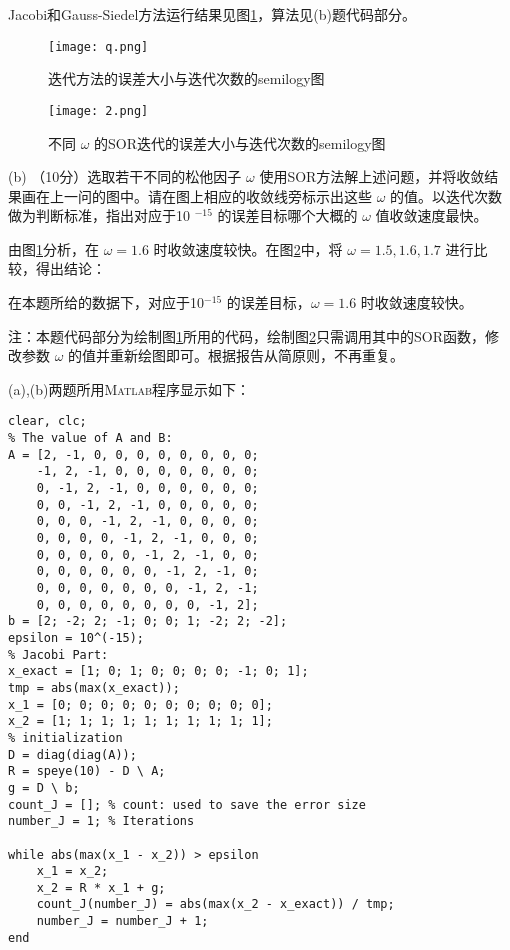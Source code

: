 \documentclass[12pt,a4paper,UTF8]{ctexart}
\begin{document}
\begin{enumerate}
          Jacobi和Gauss-Siedel方法运行结果见图\ref{4}，算法见(b)题代码部分。

          \begin{figure}[H]
              \centering
              \texttt{[image: q.png]}
              \caption{迭代方法的误差大小与迭代次数的semilogy图}\label{4}
          \end{figure}
          \begin{figure}[H]
              \centering
              \texttt{[image: 2.png]}
              \caption{不同 $\omega$ 的SOR迭代的误差大小与迭代次数的semilogy图}\label{sor}
          \end{figure}
          (b) （10分）选取若干不同的松他因子 $\omega$ 使用SOR方法解上述问题，并将收敛结果画在上一问的图中。请在图上相应的收敛线旁标示出这些 $\omega$ 的值。以迭代次数做为判断标准，指出对应于10 $^{-15}$ 的误差目标哪个大概的 $\omega$ 值收敛速度最快。

          由图\ref{4}分析，在 $\omega = 1.6$ 时收敛速度较快。在图\ref{sor}中，将 $\omega = 1.5, 1.6, 1.7$ 进行比较，得出结论：

          在本题所给的数据下，对应于10$^{-15}$ 的误差目标，$\omega = 1.6$ 时收敛速度较快。

          注：本题代码部分为绘制图\ref{4}所用的代码，绘制图\ref{sor}只需调用其中的SOR函数，修改参数 $\omega$ 的值并重新绘图即可。根据报告从简原则，不再重复。

          (a),(b)两题所用\textsc{Matlab}程序显示如下：
          \begin{lstlisting}[frame=single]
clear, clc;
% The value of A and B:
A = [2, -1, 0, 0, 0, 0, 0, 0, 0, 0;
    -1, 2, -1, 0, 0, 0, 0, 0, 0, 0;
    0, -1, 2, -1, 0, 0, 0, 0, 0, 0;
    0, 0, -1, 2, -1, 0, 0, 0, 0, 0;
    0, 0, 0, -1, 2, -1, 0, 0, 0, 0;
    0, 0, 0, 0, -1, 2, -1, 0, 0, 0;
    0, 0, 0, 0, 0, -1, 2, -1, 0, 0;
    0, 0, 0, 0, 0, 0, -1, 2, -1, 0;
    0, 0, 0, 0, 0, 0, 0, -1, 2, -1;
    0, 0, 0, 0, 0, 0, 0, 0, -1, 2];
b = [2; -2; 2; -1; 0; 0; 1; -2; 2; -2];
epsilon = 10^(-15);
% Jacobi Part:
x_exact = [1; 0; 1; 0; 0; 0; 0; -1; 0; 1];
tmp = abs(max(x_exact));
x_1 = [0; 0; 0; 0; 0; 0; 0; 0; 0; 0];
x_2 = [1; 1; 1; 1; 1; 1; 1; 1; 1; 1];
% initialization
D = diag(diag(A));
R = speye(10) - D \ A;
g = D \ b;
count_J = []; % count: used to save the error size
number_J = 1; % Iterations

while abs(max(x_1 - x_2)) > epsilon
    x_1 = x_2;
    x_2 = R * x_1 + g;
    count_J(number_J) = abs(max(x_2 - x_exact)) / tmp;
    number_J = number_J + 1;
end


\end{lstlisting}
\end{enumerate}
\end{document}
